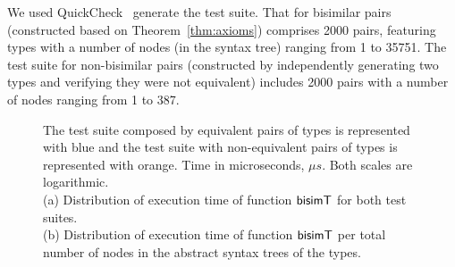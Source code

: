 We used QuickCheck~\cite{DBLP:conf/icfp/ClaessenH00} generate the test
suite. That for bisimilar pairs (constructed based on
Theorem~\ref{thm:axioms}) comprises 2000 pairs, featuring types with a
number of nodes (in the syntax tree) ranging from 1 to 35751. The test
suite for non-bisimilar pairs (constructed by independently generating
two types and verifying they were not equivalent) includes 2000
pairs with a number of nodes ranging from 1 to 387.

\begin{figure}[t]
    \centering
    \caption{The test suite composed by equivalent pairs of types is represented with blue and the
    test suite with non-equivalent pairs of types is represented with orange. Time 
    in microseconds, $\mu s$. Both scales are logarithmic.\\
    (a) Distribution of execution time of function $\mathsf{bisimT}$ for both test suites.\\
    (b) Distribution of execution time of function $\mathsf{bisimT}$ per total number of nodes 
    in the abstract syntax trees of the types.}%
    \label{fig:results}%
\end{figure}

